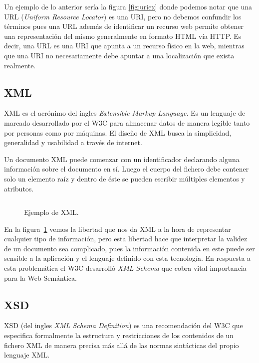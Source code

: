 Un ejemplo de lo anterior sería la figura \ref{fig:uriex} donde podemos notar
que una URL (\emph{Uniform Resource Locator}) es una URI, pero no debemos
confundir los términos pues una URL además de identificar un recurso web permite
obtener una representación del mismo generalmente en formato HTML vía HTTP. Es
decir, una URL es una URI que apunta a un recurso físico en la web, mientras que
una URI no necesariamente debe apuntar a una localización que exista realmente.

\subsection{XML}
XML es el acrónimo del ingles \emph{Extensible Markup Language}. Es un
lenguaje de marcado desarrollado por el W3C para almacenar datos de manera
legible tanto por personas como por máquinas. 
El diseño de XML busca la simplicidad, generalidad y usabilidad a través de
internet\cite{paoli2004extensible}. 

Un documento XML puede comenzar con un identificador declarando alguna
información sobre el documento en sí. Luego el cuerpo del fichero debe contener
solo un elemento raíz y dentro de éste se pueden escribir múltiples elementos y
atributos.

\begin{figure}[htpb]
  \centering
  \begin{tabular}{c}
    
  \end{tabular}
  \caption{Ejemplo de XML.}
  \vspace{-.25cm}
  \label{fig:xmlex}
\end{figure}

En la figura~\ref{fig:xmlex} vemos la libertad que nos da XML a la hora de
representar cualquier tipo de información, pero esta libertad hace que
interpretar la validez de un documento sea complicado, pues la información
contenida en este puede ser sensible a la aplicación y el lenguaje definido con
esta tecnología. En respuesta a esta problemática el W3C desarrolló \emph{XML
Schema} que cobra vital importancia para la Web Semántica.

\subsection{XSD}
XSD (del ingles \emph{XML Schema Definition}) es una recomendación del W3C que
especifica formalmente la estructura y restricciones de los contenidos de un
fichero XML de manera precisa más allá de las normas sintácticas del propio
lenguaje XML.

